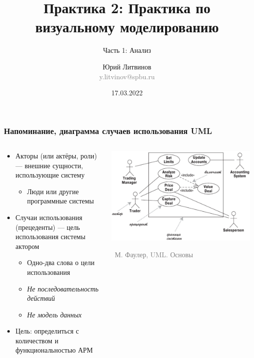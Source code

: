 \documentclass[xetex,mathserif,serif]{beamer}
\title{Практика 2: Практика по визуальному моделированию}
\subtitle{Часть 1: Анализ}
\author[Юрий Литвинов]{Юрий Литвинов\\\small{\textcolor{gray}{y.litvinov@spbu.ru}}}
\date{17.03.2022}
\newcommand{\attribution}[1] {
    \vspace{-5mm}\begin{flushright}\begin{scriptsize}\textcolor{gray}{\textcopyright\, #1}\end{scriptsize}\end{flushright}
}
\begin{document}
    \frame{\titlepage}

    \begin{frame}
        \frametitle{Напоминание, диаграмма случаев использования UML}
        \begin{columns}
            \begin{column}{0.6\textwidth}
                \begin{itemize}
                    \item Акторы (или актёры, роли) --- внешние сущности, использующие систему
                    \begin{itemize}
                        \item Люди или другие программные системы
                    \end{itemize}
                    \item Случаи использования (прецеденты)  --- цель использования системы актором
                    \begin{itemize}
                        \item Одно-два слова о цели использования
                        \item \textit{Не последовательность действий}
                        \item \textit{Не модель данных}
                    \end{itemize}
                    \item Цель: определиться с количеством и функциональностью АРМ
                \end{itemize}
            \end{column}
            \begin{column}{0.4\textwidth}
                \begin{center}
                    \includegraphics[width=\textwidth]{useCaseDiagram.png}
                    \attribution{М. Фаулер, UML. Основы}
                \end{center}
            \end{column}
        \end{columns}
    \end{frame}
\end{document}
